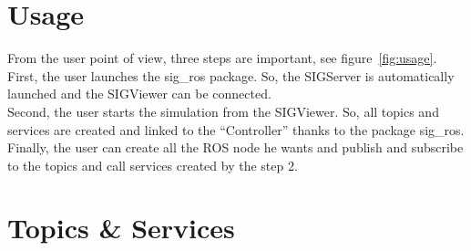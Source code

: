 \section{Usage}
From the user point of view, three steps are important, see figure~\ref{fig:usage}.\\
First, the user launches the sig\_ros package. So, the SIGServer is automatically launched and the SIGViewer can be connected.\\
Second, the user starts the simulation from the SIGViewer. So, all topics and services are created and linked to the ``Controller'' thanks to the package sig\_ros.\\
Finally, the user can create all the ROS node he wants and publish and subscribe to the topics and call services created by the step 2.

\noindent\begin{minipage}{\linewidth}%
\label{fig:usage}%
\end{minipage}

\section{Topics \& Services}
